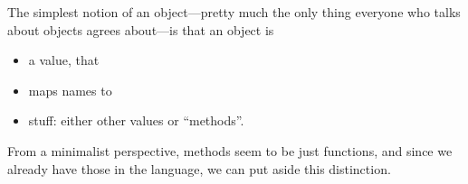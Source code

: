 
The simplest notion of an object—pretty much the only thing everyone who talks about
objects agrees about—is that an object is
\begin{itemize}[nosep]
  \item a value, that
  \item maps names to
  \item stuff: either other values or “methods”.
\end{itemize}
From a minimalist perspective, methods seem to be just functions, and since we
already have those in the language, we can put aside this distinction.

\secdown









\secup
